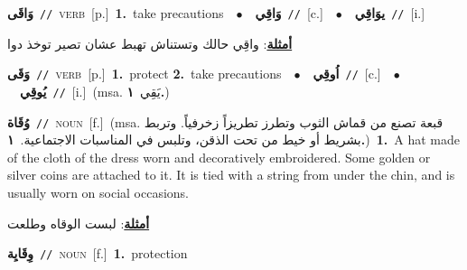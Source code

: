 \documentclass[10pt,a4paper,twoside]{article} %
\begin{document}
\begin{multicols}{2}
{\setlength\topsep{0pt}\textbf{\foreignlanguage{arabic}{وَاقَى}}\ {\color{gray}\texttt{//}\color{black}}\ \textsc{verb}\ [p.]\ \textbf{1.}~take precautions\ \ $\bullet$\ \ \setlength\topsep{0pt}\textbf{\foreignlanguage{arabic}{وَاقِي}}\ {\color{gray}\texttt{//}\color{black}}\ [c.]\ \ $\bullet$\ \ \setlength\topsep{0pt}\textbf{\foreignlanguage{arabic}{يوَاقِي}}\ {\color{gray}\texttt{//}\color{black}}\ [i.]\  \begin{flushright}\color{gray}\foreignlanguage{arabic}{\textbf{\underline{\foreignlanguage{arabic}{أمثلة}}}: واقِي حالك وتستناش تهبط عشان تصير توخذ دوا}\end{flushright}\color{black}} \vspace{2mm}

{\setlength\topsep{0pt}\textbf{\foreignlanguage{arabic}{وَقَى}}\ {\color{gray}\texttt{//}\color{black}}\ \textsc{verb}\ [p.]\ \textbf{1.}~protect  \textbf{2.}~take precautions\ \ $\bullet$\ \ \setlength\topsep{0pt}\textbf{\foreignlanguage{arabic}{اُوقِي}}\ {\color{gray}\texttt{//}\color{black}}\ [c.]\ \ $\bullet$\ \ \setlength\topsep{0pt}\textbf{\foreignlanguage{arabic}{يُوقِي}}\ {\color{gray}\texttt{//}\color{black}}\ [i.]\ \color{gray}(msa. \foreignlanguage{arabic}{يَقِي}~\foreignlanguage{arabic}{\textbf{١.}})\color{black}\ } \vspace{2mm}

{\setlength\topsep{0pt}\textbf{\foreignlanguage{arabic}{وُقَاة}}\ {\color{gray}\texttt{//}\color{black}}\ \textsc{noun}\ [f.]\ \color{gray}(msa. \foreignlanguage{arabic}{قبعة تصنع من قماش الثوب وتطرز تطريزاً زخرفياً. وتربط بشريط أو خيط من تحت الذقن، وتلبس في المناسبات الاجتماعية.}~\foreignlanguage{arabic}{\textbf{١.}})\color{black}\ \textbf{1.}~A hat made of the cloth of the dress worn and decoratively embroidered. Some golden or silver coins are attached to it. It is tied with a string from under the chin, and is usually worn on social occasions.\  \begin{flushright}\color{gray}\foreignlanguage{arabic}{\textbf{\underline{\foreignlanguage{arabic}{أمثلة}}}: لبست الوقاه وطلعت}\end{flushright}\color{black}} \vspace{2mm}

{\setlength\topsep{0pt}\textbf{\foreignlanguage{arabic}{وِقَايِة}}\ {\color{gray}\texttt{//}\color{black}}\ \textsc{noun}\ [f.]\ \textbf{1.}~protection\ } \vspace{2mm}


\end{multicols}
\end{document}

